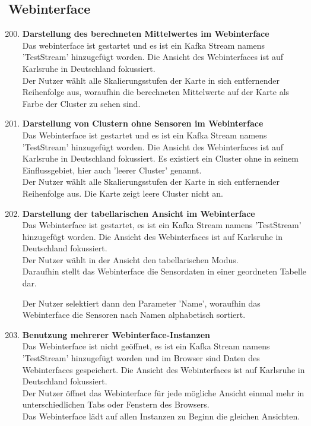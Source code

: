 \subsection{Webinterface}
\begin{enumerate}[label=\textbf{TI\arabic{enumi}0}]
	\setcounter{enumi}{199}
	
	\item \textbf{Darstellung des berechneten Mittelwertes im Webinterface}\\
		Das \gls{webinterface} ist gestartet und es ist ein Kafka Stream namens 'TestStream' hinzugefügt worden. Die Ansicht des Webinterfaces ist auf Karlsruhe in Deutschland fokussiert.\\
		Der Nutzer wählt alle Skalierungsstufen der Karte in sich entfernender Reihenfolge aus, woraufhin die berechneten Mittelwerte auf der Karte als Farbe der Cluster zu sehen sind.\par
	\item \textbf{Darstellung von Clustern ohne Sensoren im Webinterface}\\
		Das Webinterface ist gestartet und es ist ein Kafka Stream namens 'TestStream' hinzugefügt worden. Die Ansicht des Webinterfaces ist auf Karlsruhe in Deutschland fokussiert. Es existiert ein Cluster ohne  in seinem Einflussgebiet, hier auch 'leerer Cluster' genannt.\\
		Der Nutzer wählt alle Skalierungsstufen der Karte in sich entfernender Reihenfolge aus. Die Karte zeigt leere Cluster nicht an.\par
	\item \textbf{Darstellung der tabellarischen Ansicht im Webinterface}\\
		Das Webinterface ist gestartet, es ist ein Kafka Stream namens 'TestStream' hinzugefügt worden. Die Ansicht des Webinterfaces ist auf Karlsruhe in Deutschland fokussiert.\\
		Der Nutzer wählt in der Ansicht den tabellarischen Modus.\\
		Daraufhin stellt das Webinterface die Sensordaten in einer geordneten Tabelle dar.\par
		
		Der Nutzer selektiert dann den Parameter 'Name', woraufhin das Webinterface die Sensoren nach Namen alphabetisch sortiert.
	\item \textbf{Benutzung mehrerer Webinterface-Instanzen}\\
		Das Webinterface ist nicht geöffnet, es ist ein Kafka Stream namens 'TestStream' hinzugefügt worden und im Browser sind Daten des Webinterfaces gespeichert. Die Ansicht des Webinterfaces ist auf Karlsruhe in Deutschland fokussiert.\\
		Der Nutzer öffnet das Webinterface für jede mögliche Ansicht einmal mehr in unterschiedlichen Tabs oder Fenstern des Browsers.\\
		Das Webinterface lädt auf allen Instanzen zu Beginn die gleichen Ansichten.\par
		

\end{enumerate}
